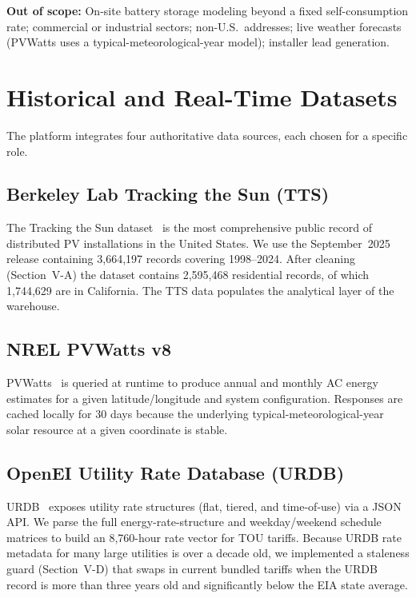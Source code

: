 \documentclass[10pt, conference]{IEEEtran}
\begin{document}
\textbf{Out of scope:} On-site battery storage modeling beyond a fixed self-consumption rate; commercial or industrial sectors; non-U.S.\ addresses; live weather forecasts (PVWatts uses a typical-meteorological-year model); installer lead generation.

\section{Historical and Real-Time Datasets}

The platform integrates four authoritative data sources, each chosen for a specific role.

\subsection{Berkeley Lab Tracking the Sun (TTS)}

The Tracking the Sun dataset~\cite{LBNL2025} is the most comprehensive public record of distributed PV installations in the United States. We use the September~2025 release containing 3{,}664{,}197 records covering 1998--2024. After cleaning (Section~V-A) the dataset contains 2{,}595{,}468 residential records, of which 1{,}744{,}629 are in California. The TTS data populates the analytical layer of the warehouse.

\subsection{NREL PVWatts v8}

PVWatts~\cite{NRELPVWatts} is queried at runtime to produce annual and monthly AC energy estimates for a given latitude/longitude and system configuration. Responses are cached locally for 30 days because the underlying typical-meteorological-year solar resource at a given coordinate is stable.

\subsection{OpenEI Utility Rate Database (URDB)}

URDB~\cite{URDB} exposes utility rate structures (flat, tiered, and time-of-use) via a JSON API. We parse the full energy-rate-structure and weekday/weekend schedule matrices to build an 8{,}760-hour rate vector for TOU tariffs. Because URDB rate metadata for many large utilities is over a decade old, we implemented a staleness guard (Section~V-D) that swaps in current bundled tariffs when the URDB record is more than three years old and significantly below the EIA state average.
\end{document}
